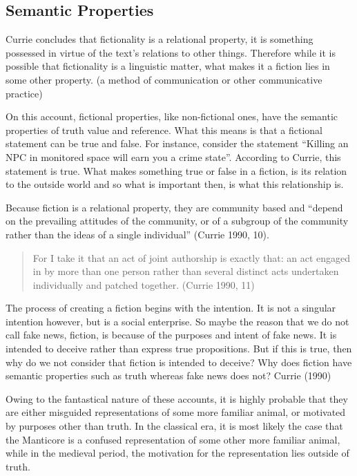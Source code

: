 \documentclass[
  letterpaper,
  DIV=11,
  numbers=noendperiod]{scrreprt}
\begin{document}
\begin{tcolorbox}[enhanced jigsaw, arc=.35mm, breakable, rightrule=.15mm, colback=white, colframe=quarto-callout-important-color-frame, bottomrule=.15mm, leftrule=.75mm, opacityback=0, toprule=.15mm, left=2mm]
\begin{tcolorbox}[enhanced jigsaw, arc=.35mm, breakable, rightrule=.15mm, colback=white, colframe=quarto-callout-tip-color-frame, bottomrule=.15mm, leftrule=.75mm, opacityback=0, toprule=.15mm, left=2mm]
\section{Semantic Properties}\label{semantic-properties-1}

Currie concludes that fictionality is a relational property, it is
something possessed in virtue of the text's relations to other things.
Therefore while it is possible that fictionality is a linguistic matter,
what makes it a fiction lies in some other property. (a method of
communication or other communicative practice)

On this account, fictional properties, like non-fictional ones, have the
semantic properties of truth value and reference. What this means is
that a fictional statement can be true and false. For instance, consider
the statement ``Killing an NPC in monitored space will earn you a crime
state''. According to Currie, this statement is true. What makes
something true or false in a fiction, is its relation to the outside
world and so what is important then, is what this relationship is.

Because fiction is a relational property, they are community based and
``depend on the prevailing attitudes of the community, or of a subgroup
of the community rather than the ideas of a single individual'' (Currie
1990, 10).

\begin{quote}
For I take it that an act of joint authorship is exactly that: an act
engaged in by more than one person rather than several distinct acts
undertaken individually and patched together. (Currie 1990, 11)
\end{quote}

The process of creating a fiction begins with the intention. It is not a
singular intention however, but is a social enterprise. So maybe the
reason that we do not call fake news, fiction, is because of the
purposes and intent of fake news. It is intended to deceive rather than
express true propositions. But if this is true, then why do we not
consider that fiction is intended to deceive? Why does fiction have
semantic properties such as truth whereas fake news does not? Currie
(1990)

Owing to the fantastical nature of these accounts, it is highly probable
that they are either misguided representations of some more familiar
animal, or motivated by purposes other than truth. In the classical era,
it is most likely the case that the Manticore is a confused
representation of some other more familiar animal, while in the medieval
period, the motivation for the representation lies outside of truth.


\end{tcolorbox}
\end{tcolorbox}
\end{document}
